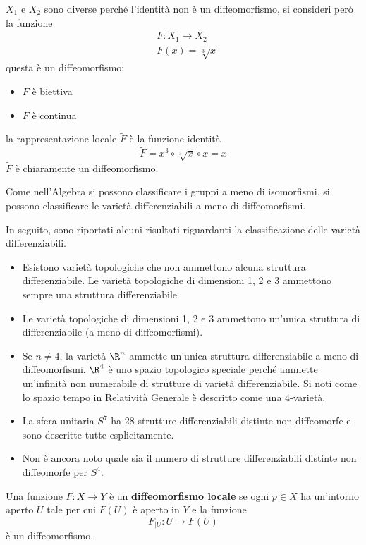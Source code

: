 \documentclass[10pt, letterpaper]{report}
\begin{document}
$X_1$ e $X_2$ sono diverse perché l'identità non è un diffeomorfismo, si consideri però la funzione\begin{align}
    &F:X_1\rightarrow X_2\\
    &F(x)=\sqrt[3]{x}
\end{align}
questa è un diffeomorfismo:\begin{itemize}
    \item $F$ è biettiva
    \item $F$ è continua
\end{itemize}
la rappresentazione locale  $\tilde F$ è la funzione identità\begin{equation}
    \tilde F = x^3\circ \sqrt[3]{x}\circ x=x
\end{equation}
$\tilde F$ è chiaramente un diffeomorfismo.
\begin{osservazione}
    Come nell'Algebra si possono classificare i gruppi a meno di isomorfismi, si possono classificare le varietà differenziabili a meno di diffeomorfismi.
\end{osservazione}
In seguito, sono riportati alcuni risultati riguardanti la classificazione delle varietà differenziabili.\begin{itemize}
    \item Esistono varietà topologiche che non ammettono alcuna struttura differenziabile. Le varietà topologiche di dimensioni 1, 2 e 3 ammettono sempre una struttura differenziabile
    \item Le varietà topologiche di dimensioni 1, 2 e 3 ammettono un'unica struttura di differenziabile (a meno di diffeomorfismi).
    \item Se $n\ne 4$, la varietà $\R^n$ ammette un'unica struttura differenziabile a meno di diffeomorfismi. $\R^4$ è uno spazio topologico speciale perché ammette un'infinità non numerabile di strutture di varietà differenziabile. Si noti come lo spazio tempo in Relatività Generale è descritto come una $4$-varietà.
    \item La sfera unitaria $S^7$ ha 28 strutture differenziabili distinte non diffeomorfe e sono descritte tutte esplicitamente.
    \item Non è ancora noto quale sia il numero di strutture differenziabili distinte non diffeomorfe per $S^4$.
\end{itemize}
\begin{definizione}
    Una funzione $F:X\rightarrow Y$ è un \textbf{diffeomorfismo locale} se ogni $p\in X$ ha un'intorno aperto $U$ tale per cui $F(U)$ è aperto in $Y$ e la funzione\begin{equation}
        F_{|U}:U\rightarrow F(U)
    \end{equation}
    è un diffeomorfismo.
\end{definizione}
\end{document}
